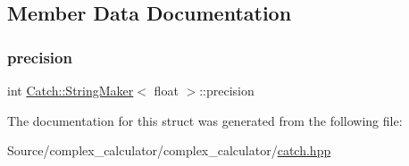 \subsection{Member Data Documentation}
\mbox{\label{struct_catch_1_1_string_maker_3_01float_01_4_a54ebebe76a755dbe2dd8ad409c329378}} 
\subsubsection{\texorpdfstring{precision}{precision}}
{\footnotesize\ttfamily int \mbox{\hyperlink{struct_catch_1_1_string_maker}{Catch\+::\+String\+Maker}}$<$ float $>$\+::precision\hspace{0.3cm}{\ttfamily [static]}}



The documentation for this struct was generated from the following file\+:\begin{DoxyCompactItemize}
\item 
Source/complex\+\_\+calculator/complex\+\_\+calculator/\mbox{\hyperlink{catch_8hpp}{catch.\+hpp}}\end{DoxyCompactItemize}
